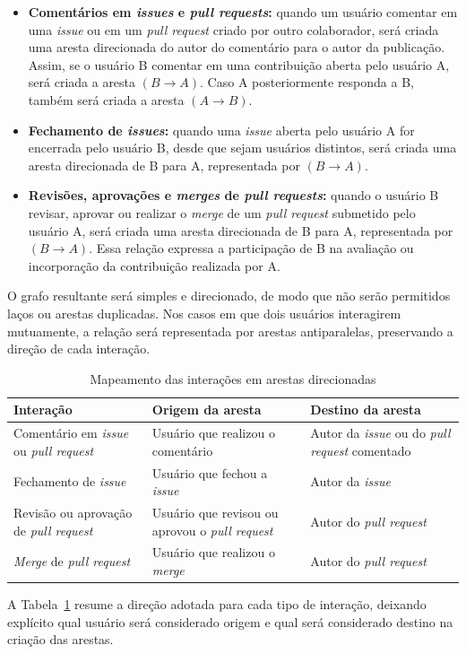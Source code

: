 \documentclass[12pt]{article}
\begin{document}
\begin{itemize}
    \item \textbf{Comentários em \textit{issues} e \textit{pull requests}:} quando um usuário comentar em uma \textit{issue} ou em um \textit{pull request} criado por outro colaborador, será criada uma aresta direcionada do autor do comentário para o autor da publicação. Assim, se o usuário B comentar em uma contribuição aberta pelo usuário A, será criada a aresta $(B \rightarrow A)$. Caso A posteriormente responda a B, também será criada a aresta $(A \rightarrow B)$.

    \item \textbf{Fechamento de \textit{issues}:} quando uma \textit{issue} aberta pelo usuário A for encerrada pelo usuário B, desde que sejam usuários distintos, será criada uma aresta direcionada de B para A, representada por $(B \rightarrow A)$.

    \item \textbf{Revisões, aprovações e \textit{merges} de \textit{pull requests}:} quando o usuário B revisar, aprovar ou realizar o \textit{merge} de um \textit{pull request} submetido pelo usuário A, será criada uma aresta direcionada de B para A, representada por $(B \rightarrow A)$. Essa relação expressa a participação de B na avaliação ou incorporação da contribuição realizada por A.
\end{itemize}

O grafo resultante será simples e direcionado, de modo que não serão permitidos laços ou arestas duplicadas. Nos casos em que dois usuários interagirem mutuamente, a relação será representada por arestas antiparalelas, preservando a direção de cada interação.

\begin{table}[htb]
\centering
\caption{Mapeamento das interações em arestas direcionadas}
\label{tab:mapeamento_arestas}
\begin{tabular}{|p{4.2cm}|p{4.2cm}|p{4.2cm}|}
\hline
\textbf{Interação} & \textbf{Origem da aresta} & \textbf{Destino da aresta} \\ \hline
Comentário em \textit{issue} ou \textit{pull request} & Usuário que realizou o comentário & Autor da \textit{issue} ou do \textit{pull request} comentado \\ \hline
Fechamento de \textit{issue} & Usuário que fechou a \textit{issue} & Autor da \textit{issue} \\ \hline
Revisão ou aprovação de \textit{pull request} & Usuário que revisou ou aprovou o \textit{pull request} & Autor do \textit{pull request} \\ \hline
\textit{Merge} de \textit{pull request} & Usuário que realizou o \textit{merge} & Autor do \textit{pull request} \\ \hline
\end{tabular}
\end{table}
A Tabela~\ref{tab:mapeamento_arestas} resume a direção adotada para cada tipo de interação, deixando explícito qual usuário será considerado origem e qual será considerado destino na criação das arestas.
\end{document}
